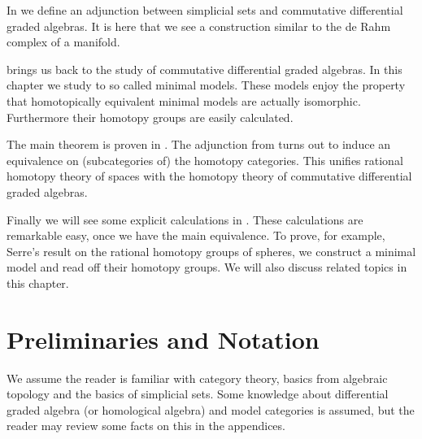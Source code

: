 In  we define an adjunction between simplicial sets and commutative differential graded algebras. It is here that we see a construction similar to the de Rahm complex of a manifold.

 brings us back to the study of commutative differential graded algebras. In this chapter we study to so called minimal models. These models enjoy the property that homotopically equivalent minimal models are actually isomorphic. Furthermore their homotopy groups are easily calculated.

The main theorem is proven in . The adjunction from  turns out to induce an equivalence on (subcategories of) the homotopy categories. This unifies rational homotopy theory of spaces with the homotopy theory of commutative differential graded algebras.

Finally we will see some explicit calculations in . These calculations are remarkable easy, once we have the main equivalence. To prove, for example, Serre's result on the rational homotopy groups of spheres, we construct a minimal model and read off their homotopy groups. We will also discuss related topics in this chapter.

\section{Preliminaries and Notation}

We assume the reader is familiar with category theory, basics from algebraic topology and the basics of simplicial sets. Some knowledge about differential graded algebra (or homological algebra) and model categories is assumed, but the reader may review some facts on this in the appendices.

